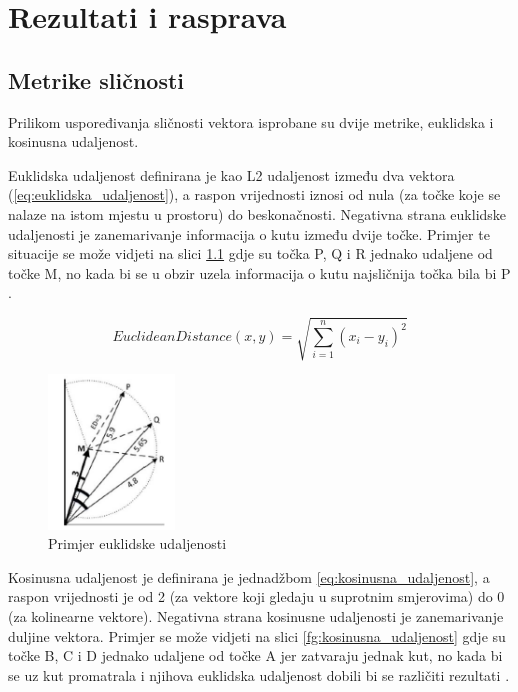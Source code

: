 \documentclass[times, utf8, proizvoljni, numeric]{fer}
\begin{document}
\chapter{Rezultati i rasprava}

\section{Metrike sličnosti}

Prilikom uspoređivanja sličnosti vektora isprobane su dvije metrike, euklidska i kosinusna udaljenost. 

Euklidska udaljenost definirana je kao L2 udaljenost između dva vektora (\ref{eq:euklidska_udaljenost}), a raspon vrijednosti iznosi od nula (za točke koje se nalaze na istom mjestu u prostoru) do beskonačnosti. Negativna strana euklidske udaljenosti je zanemarivanje informacija o kutu između dvije točke. Primjer te situacije se može vidjeti na slici \ref{fg:euklidska_udaljenost} gdje su točka P, Q i R jednako udaljene od točke M, no kada bi se u obzir uzela informacija o kutu najsličnija točka bila bi P \cite{VectorSimilarity}.

\begin{equation}
\label{eq:euklidska_udaljenost}
EuclideanDistance(x,y) = \sqrt{\sum_{i=1}^n (x_i-y_i)^2}    
\end{equation}

\begin{figure}[!ht]
	\begin{center}
		\captionsetup{justification=centering}
		\includegraphics[width=0.3\textwidth]{./imgs/euklidska_udaljenost.png}
		\caption{Primjer euklidske udaljenosti \cite{VectorSimilarity}}
		\label{fg:euklidska_udaljenost}
	\end{center}
\end{figure}

Kosinusna udaljenost je definirana je jednadžbom \ref{eq:kosinusna_udaljenost}, a raspon vrijednosti je od 2 (za vektore koji gledaju u suprotnim smjerovima) do 0 (za kolinearne vektore). Negativna strana kosinusne udaljenosti je zanemarivanje duljine vektora. Primjer se može vidjeti na slici \ref{fg:kosinusna_udaljenost} gdje su točke B, C i D jednako udaljene od točke A jer zatvaraju jednak kut, no kada bi se uz kut promatrala i njihova euklidska udaljenost dobili bi se različiti rezultati \cite{VectorSimilarity}.
\end{document}
